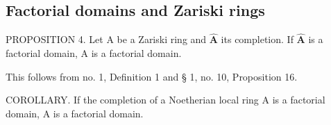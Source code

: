 \subsection{Factorial domains and Zariski rings}

PROPOSITION 4. Let A be a Zariski ring and \(\hat{\mathbf{A}}\) its completion. If \(\hat{\mathbf{A}}\) is a factorial domain, A is a factorial domain.

This follows from no. 1, Definition 1 and § 1, no. 10, Proposition 16.

COROLLARY. If the completion of a Noetherian local ring A is a factorial domain, A is a factorial domain.
\relax{}
